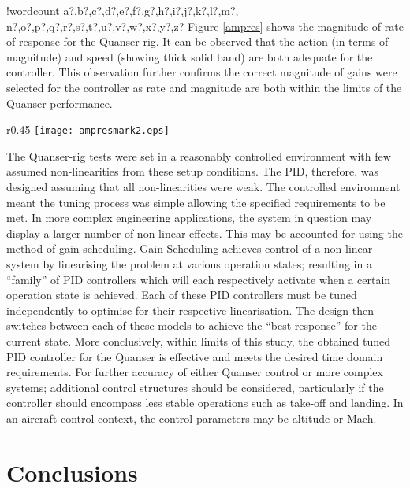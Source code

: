 \documentclass[11pt]{article}
\newcounter{words}
\newenvironment{counted}{%
  \setcounter{words}{0}
  \SearchList!{wordcount}{\stepcounter{words}}
    {a?,b?,c?,d?,e?,f?,g?,h?,i?,j?,k?,l?,m?,
    n?,o?,p?,q?,r?,s?,t?,u?,v?,w?,x?,y?,z?}
  \UndoBoundary{'}
  \SearchOrder{p;}}{%
  \StopSearching}
\begin{document}
\begin{counted}
Figure \ref{ampres} shows the magnitude of rate of response for the
Quanser-rig. It can be observed that the action (in terms of magnitude)
and speed (showing thick solid band) are both adequate for the
controller. This observation further confirms the correct magnitude of
gains were selected for the controller as rate and magnitude are both
within the limits of the Quanser performance.

\begin{wrapfigure}{r}{0.45\textwidth}
\vspace{-10pt}
\centering
 \texttt{[image: ampresmark2.eps]}
\vspace{-5pt}
\caption{Showing Magnitude of Rate Response}
 \vspace{-20pt}
 \label{ampres}
\end{wrapfigure}

The Quanser-rig tests were set in a reasonably controlled environment
with few assumed non-linearities from these setup conditions. The PID,
therefore, was designed assuming that all non-linearities were weak. The
controlled environment meant the tuning process was simple allowing the
specified requirements to be met. In more complex engineering
applications, the system in question may display a larger number of
non-linear effects. This may be accounted for using the method of gain
scheduling. Gain Scheduling \cite{stackcont} achieves control of a
non-linear system by linearising the problem at various operation
states; resulting in a ``family'' of PID controllers which will each
respectively activate when a certain operation state is achieved. Each
of these PID controllers must be tuned independently to optimise for
their respective linearisation. The design then switches between each of
these models to achieve the ``best response'' for the current state.
More conclusively, within limits of this study, the obtained tuned PID
controller for the Quanser is effective and meets the desired time
domain requirements. For further accuracy of either Quanser control or
more complex systems; additional control structures should be
considered, particularly if the controller should encompass less stable
operations such as take-off and landing. In an aircraft control context,
the control parameters may be altitude or Mach.

\section{Conclusions}\label{conclusions}


\end{counted}
\end{document}
